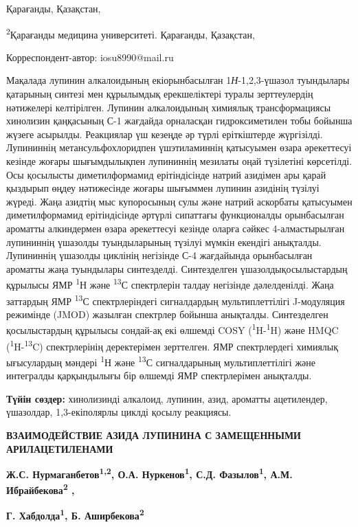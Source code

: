 Қарағанды, Қазақстан,

\textsuperscript{2}Қарағанды медицина университеті. Қарағанды,
Қазақстан,

Корреспондент-автор: iosu8990@mail.ru

Мақалада лупинин алкалоидының екіорынбасылған 1\emph{Н}-1,2,3-үшазол
туындылары қатарының синтезі мен құрылымдық ерекшеліктері туралы
зерттеулердің нәтижелері келтірілген. Лупинин алкалоидының химиялық
трансформациясы хинолизин қаңқасының С-1 жағдайда орналасқан
гидроксиметилен тобы бойынша жүзеге асырылды. Реакциялар үш кезеңде әр
түрлі еріткіштерде жүргізілді. Лупининнің метансульфохлоридпен
үшэтиламиннің қатысуымен өзара әрекеттесуі кезінде жоғары шығымдылықпен
лупининнің мезилаты оңай түзілетіні көрсетілді. Осы қосылысты
диметилформамид ерітіндісінде натрий азидімен ары қарай қыздырып өңдеу
нәтижесінде жоғары шығыммен лупинин азидінің түзілуі жүреді. Жаңа
азидтің мыс купоросының сулы және натрий аскорбаты қатысуымен
диметилформамид ерітіндісінде әртүрлі сипаттағы функционалды
орынбасылған ароматты алкиндермен өзара әрекеттесуі кезінде оларға
сәйкес 4-алмастырылған лупининнің үшазолды туындыларының түзілуі мүмкін
екендігі анықталды. Лупининнің үшазолды циклінің негізінде С-4
жағдайында орынбасылған ароматты жаңа туындылары синтезделді.
Синтезделген үшазолдықосылыстардың құрылысы ЯМР \textsuperscript{1}Н
және \textsuperscript{13}С спектрлерін талдау негізінде дәлелденілді.
Жаңа заттардың ЯМР \textsuperscript{13}С спектрлеріндегі сигналдардың
мультиплеттілігі J-модуляция режимінде (JMOD) жазылған спектрлер бойынша
анықталды. Синтезделген қосылыстардың құрылысы сондай-ақ екі өлшемді
COSY (\textsuperscript{1}H-\textsuperscript{1}H) және HMQC
(\textsuperscript{1}H-\textsuperscript{13}C) спектрлерінің деректерімен
зерттелген. ЯМР спектрлердегі химиялық ығысулардың мәндері
\textsuperscript{1}Н және \textsuperscript{13}С сигналдарының
мультиплеттілігі және интегралды қарқындылығы бір өлшемді ЯМР
спектрлерімен анықталды.

\textbf{Түйін сөздер:} хинолизинді алкалоид, лупинин, азид, ароматты
ацетилендер, үшазолдар, 1,3-екіполярлы циклді қосылу реакциясы.

\textbf{ВЗАИМОДЕЙСТВИЕ АЗИДА ЛУПИНИНА С ЗАМЕЩЕННЫМИ АРИЛАЦЕТИЛЕНАМИ}

\textbf{Ж.С. Нурмаганбетов\textsuperscript{1,2}, О.А.
Нуркенов\textsuperscript{1}, С.Д. Фазылов\textsuperscript{1}, А.М.
Ибрайбекова\textsuperscript{2} ,}

\textbf{Г. Хабдолда\textsuperscript{1}, Б.
Аширбекова\textsuperscript{2}}

